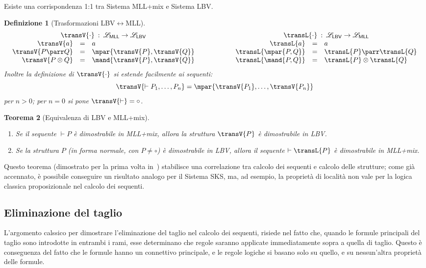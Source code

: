 \documentclass[12pt,a4paper,openright,twoside]{report}
\newtheorem{thm}{Teorema}[section]
\newtheorem{dfn}[thm]{Definizione}
\begin{document}
Esiste una corrispondenza 1:1 tra Sistema \textsf{MLL+mix} e Sistema \textsf{LBV}.

\begin{dfn}[Trasformazioni \textsf{LBV}$\leftrightarrow$\textsf{MLL}]
$$
\begin{array}{rclcrcl}
	\multicolumn{3}{c}{\transV{\cdot} \::\: \mathscr{L}_\mathsf{MLL}\rightarrow\mathscr{L}_\mathsf{LBV}} & \qquad\qquad & \multicolumn{3}{c}{\transL{\cdot} \::\: \mathscr{L}_\mathsf{LBV}\rightarrow\mathscr{L}_\mathsf{MLL}} \\
	\transV{a} & = & a & ~ & \transL{a} & = & a \\
	\transV{P \parr Q} & = & \mpar{\transV{P}, \transV{Q}} & ~ & \transL{\mpar{P, Q}} & = & \transL{P} \parr \transL{Q} \\
	\transV{P \otimes Q} & = & \mand{\transV{P}, \transV{Q}} & ~ & \transL{\mand{P,Q}} & = & \transL{P} \otimes \transL{Q}
\end{array}
$$
Inoltre la definizione di $\transV{\cdot}$ si estende facilmente ai sequenti:
$$
	\transV{\vdash P_1, \ldots, P_n} = \mpar{\transV{P_1}, \ldots, \transV{P_n}}
$$
per $n > 0$; per $n=0$ si pone $\transV{\vdash} = \circ$.
\end{dfn}

\begin{thm}[Equivalenza di \textsf{LBV} e \textsf{MLL+mix}]~\\
\begin{enumerate}[label=\roman*)]
	\item Se il sequente $\vdash P$ \`e dimostrabile in \textsf{MLL+mix}, allora la struttura $\transV{P}$ \`e dimostrabile in \textsf{LBV}.
	\item Se la struttura $P$ (in forma normale, con $P \not= \circ$) \`e dimostrabile in \textsf{LBV}, allora il sequente $\vdash \transL{P}$ \`e dimostrabile in \textsf{MLL+mix}.
\end{enumerate}
\end{thm}

Questo teorema (dimostrato per la prima volta in~\cite{Gug02}) stabilisce una correlazione tra calcolo dei sequenti e calcolo delle strutture; come gi\`a accennato, \`e possibile conseguire un risultato analogo per il Sistema \textsf{SKS}, ma, ad esempio, la propriet\`a di localit\`a non vale per la logica classica proposizionale nel calcolo dei sequenti.

\newpage

\subsection{Eliminazione del taglio} 
L'argomento calssico per dimostrare l'eliminazione del taglio nel calcolo dei sequenti, risiede nel fatto che, quando le formule principali del taglio sono introdotte in entrambi i rami, esse determinano che regole saranno applicate immediatamente sopra a quella di taglio. Questo \`e conseguenza del fatto che le formule hanno un connettivo principale, e le regole logiche si basano solo su quello, e su nessun'altra propriet\`a delle formule.
\end{document}
